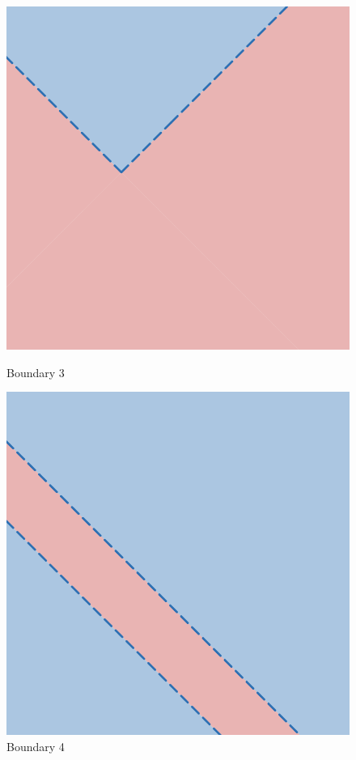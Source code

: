 \begin{figure}[H]
    \vspace{0.5cm} 
    
    \begin{minipage}{0.45\textwidth}
        \centering
        \includegraphics[width=\textwidth]{images/boundaries/tri.png}
        \caption{Boundary 3}
        \label{fig:tri}
    \end{minipage}
    \hfill
    \begin{minipage}{0.45\textwidth}
        \centering
        \includegraphics[width=\textwidth]{images/boundaries/parallel.png}
        \caption{Boundary 4}
        \label{fig:parallel}
    \end{minipage}

\end{figure}

